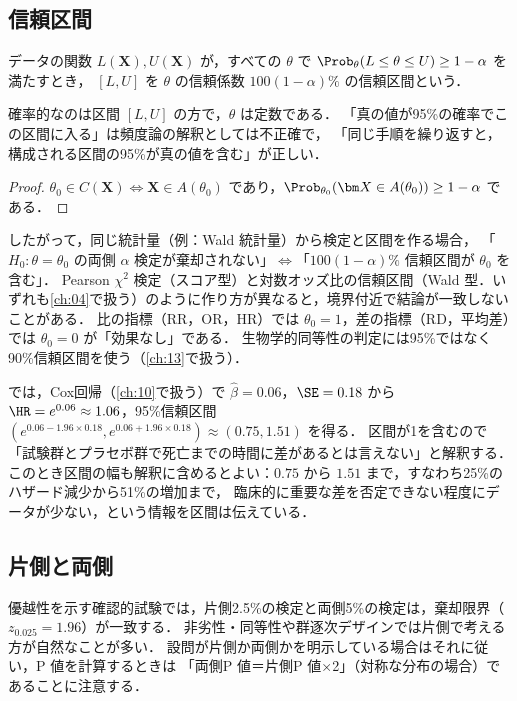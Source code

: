 \subsection{信頼区間}\label{subsec:01-ci}
\begin{teigi}[信頼区間]\label{def:01-ci}
データの関数 $L(\bm X),U(\bm X)$ が，すべての $\theta$ で $\Prob_\theta(L\le\theta\le U)\ge 1-\alpha$ を満たすとき，
$[L,U]$ を $\theta$ の信頼係数 $100(1-\alpha)\%$ の信頼区間という．
\end{teigi}
確率的なのは区間 $[L,U]$ の方で，$\theta$ は定数である．
「真の値が95\%の確率でこの区間に入る」は頻度論の解釈としては不正確で，
「同じ手順を繰り返すと，構成される区間の95\%が真の値を含む」が正しい．

\begin{proof}
$\theta_0\in C(\bm X)\iff \bm X\in A(\theta_0)$ であり，$\Prob_{\theta_0}(\bm X\in A(\theta_0))\ge1-\alpha$ である．
\end{proof}
したがって，同じ統計量（例：Wald 統計量）から検定と区間を作る場合，
「$H_0:\theta=\theta_0$ の両側 $\alpha$ 検定が棄却されない」$\iff$「$100(1-\alpha)\%$ 信頼区間が $\theta_0$ を含む」．
Pearson $\chi^2$ 検定（スコア型）と対数オッズ比の信頼区間（Wald 型．いずれも\cref{ch:04}で扱う）のように作り方が異なると，境界付近で結論が一致しないことがある．
比の指標（RR，OR，HR）では $\theta_0=1$，差の指標（RD，平均差）では $\theta_0=0$ が「効果なし」である．
\Youchui 生物学的同等性の判定には95\%ではなく90\%信頼区間を使う（\cref{ch:13}で扱う）．

 では，Cox回帰（\cref{ch:10}で扱う）で $\hat\beta=0.06$，$\SE=0.18$ から
$\HR=e^{0.06}\approx1.06$，95\%信頼区間 $(e^{0.06-1.96\times0.18},e^{0.06+1.96\times0.18})\approx(0.75,1.51)$ を得る．
区間が1を含むので「試験群とプラセボ群で死亡までの時間に差があるとは言えない」と解釈する．
このとき区間の幅も解釈に含めるとよい：$0.75$ から $1.51$ まで，すなわち25\%のハザード減少から51\%の増加まで，
臨床的に重要な差を否定できない程度にデータが少ない，という情報を区間は伝えている．

\subsection{片側と両側}\label{subsec:01-sided}
優越性を示す確認的試験では，片側2.5\%の検定と両側5\%の検定は，棄却限界（$z_{0.025}=1.96$）が一致する．
非劣性・同等性や群逐次デザインでは片側で考える方が自然なことが多い．
設問が片側か両側かを明示している場合はそれに従い，P 値を計算するときは
「両側P 値＝片側P 値×2」（対称な分布の場合）であることに注意する．

